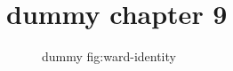 \clearpage\begingroup\small
\setcounter{chapter}{9}\addtocounter{chapter}{-1}
\chapter{dummy chapter 9}
\begin{figure}[h]\centering{}\caption{dummy fig:ward-identity}\label{fig:ward-identity}\end{figure}
\endgroup
